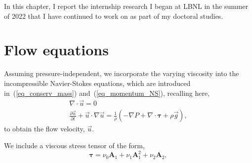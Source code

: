 \par
In this chapter, I report the internship research I began at LBNL in the summer of 2022 that I have continued to work on as part of my doctoral studies.
\par



\section{Flow equations}
Assuming pressure-independent, we incorporate the varying viscosity into the incompressible Navier-Stokes equations, which are introduced in~(\ref{eq_conserv_mass}) and~(\ref{eq_momentum_NS}), recalling here,
\begin{align}
  \nabla \cdot \vec{u} = 0 
  \nonumber
  \\
  \frac{\partial \vec{u}}{\partial t} + \vec{u}\cdot \nabla \vec{u}
  = \frac{1}{\rho}
  \left(
  - \nabla P 
      + \nabla \cdot   \bm{\tau} 
      +  \rho  \vec{g} 
      \right),
      \nonumber
\end{align}
to obtain the flow velocity, $\vec{u}$.

We include a viscous stress tensor of the form,
\begin{equation}
   \boldsymbol{\tau} = 
    \nu_0  \bm{A}_1 +  \nu_1  \bm{A}_1^2 + \nu_2 \bm{A}_2,
   \label{eq_CN_tau}
\end{equation}

